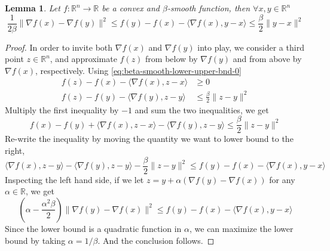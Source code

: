 \documentclass{scrartcl}
\newtheorem{lemma}{Lemma}
\newcommand{\RR}{\mathbb{R}}
\begin{document}
\begin{lemma}
  Let $f:\RR^n\rightarrow\RR$ be a convex and $\beta$-smooth function, then $\forall x,y\in\RR^n$
  \begin{equation}
  \frac{1}{2\beta}\|\nabla f(x)-\nabla f(y)\|^2
  \leq f(y) - f(x) - \langle \nabla f(x), y-x\rangle
  \leq \frac {\beta} {2}\|y-x\|^2
  \end{equation}
\end{lemma}
\begin{proof}
  In order to invite both $\nabla f(x)$ and $\nabla f(y)$ into play, we consider a third point
  $z\in\RR^n$, and approximate $f(z)$ from below by $\nabla f(y)$ and from above by $\nabla f(x)$,
  respectively. Using \eqref{eq:beta-smooth-lower-upper-bnd-0}
  \[
  \begin{aligned}
    f(z) - f(x) - \langle \nabla f(x), z-x\rangle &\geq 0\\
    f(z) - f(y) - \langle \nabla f(y), z-y\rangle &\leq \frac{\beta}{2}\|z-y\|^2
  \end{aligned}
  \]
  Multiply the first inequality by $-1$ and sum the two inequalities, we get
  \[
  f(x)-f(y)+\langle \nabla f(x), z-x\rangle - \langle \nabla f(y),z-y\rangle \leq \frac{\beta}
  {2}\|z-y\|^2
  \]
  Re-write the inequality by moving the quantity we want to lower bound to the right,
  \[
   \langle \nabla f(x), z-y\rangle - \langle \nabla f(y),z-y\rangle - \frac{\beta}{2}\|z-y\|^2\leq f
   (y)-f (x)-\langle \nabla f (x),y-x\rangle
  \]
  Inspecting the left hand side, if we let $z=y+\alpha (\nabla f(y)-\nabla f(x))$ for any
  $\alpha\in\RR$, we get
  \[
  \left(\alpha - \frac{\alpha^2\beta}{2}\right)\|\nabla f(y)-\nabla f(x)\|^2\leq f (y)-f (x)-\langle
  \nabla f
  (x),y-x\rangle
  \]
  Since the lower bound is a quadratic function in $\alpha$, we can maximize the lower bound by
  taking $\alpha = 1/\beta$. And the conclusion follows.
\end{proof}
%
%
\end{document}
